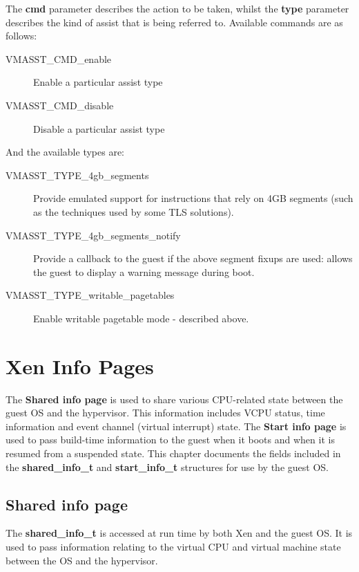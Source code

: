 \documentclass[11pt,twoside,final,openright]{report}
\newcommand{\hypercall}[1]{\vspace{2mm}{\sf #1}}
\begin{document}
\hypercall{vm\_assist(unsigned int cmd, unsigned int type)}

The {\bf cmd} parameter describes the action to be taken, whilst the
{\bf type} parameter describes the kind of assist that is being
referred to.  Available commands are as follows:

\begin{description}
\item[VMASST\_CMD\_enable] Enable a particular assist type
\item[VMASST\_CMD\_disable] Disable a particular assist type
\end{description}

And the available types are:

\begin{description}
\item[VMASST\_TYPE\_4gb\_segments] Provide emulated support for
  instructions that rely on 4GB segments (such as the techniques used
  by some TLS solutions).
\item[VMASST\_TYPE\_4gb\_segments\_notify] Provide a callback to the
  guest if the above segment fixups are used: allows the guest to
  display a warning message during boot.
\item[VMASST\_TYPE\_writable\_pagetables] Enable writable pagetable
  mode - described above.
\end{description}


\chapter{Xen Info Pages}

The {\bf Shared info page} is used to share various CPU-related state
between the guest OS and the hypervisor.  This information includes VCPU
status, time information and event channel (virtual interrupt) state.
The {\bf Start info page} is used to pass build-time information to
the guest when it boots and when it is resumed from a suspended state.
This chapter documents the fields included in the {\bf
shared\_info\_t} and {\bf start\_info\_t} structures for use by the
guest OS.

\section{Shared info page}

The {\bf shared\_info\_t} is accessed at run time by both Xen and the
guest OS.  It is used to pass information relating to the
virtual CPU and virtual machine state between the OS and the
hypervisor.
\end{document}

